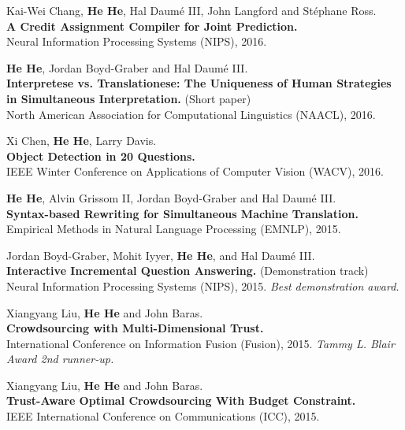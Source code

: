 \documentclass[margin,line]{resume}
\begin{document}
\begin{resume}
Kai-Wei Chang, {\bf He He}, Hal Daum\'e III, John Langford and St\'ephane Ross.\\
{\bf A Credit Assignment Compiler for Joint Prediction.}\\
Neural Information Processing Systems (NIPS), 2016. 

{\bf He He}, Jordan Boyd-Graber and Hal Daum\'e III.\\
{\bf Interpretese vs. Translationese: The Uniqueness of Human Strategies in Simultaneous Interpretation.} (Short paper)\\
North American Association for Computational Linguistics (NAACL), 2016.%

Xi Chen, {\bf He He}, Larry Davis.\\
{\bf Object Detection in 20 Questions.}\\
IEEE Winter Conference on Applications of Computer Vision (WACV), 2016.%

{\bf He He}, Alvin Grissom II, Jordan Boyd-Graber and Hal Daum\'e III.\\
{\bf Syntax-based Rewriting for Simultaneous Machine Translation.}\\
Empirical Methods in Natural Language Processing (EMNLP), 2015.%

Jordan Boyd-Graber, Mohit Iyyer, {\bf He He}, and Hal Daum\'e III.\\
{\bf Interactive Incremental Question Answering.} (Demonstration track)\\
Neural Information Processing Systems (NIPS), 2015. 
\emph{Best demonstration award.}

Xiangyang Liu, {\bf He He} and John Baras.\\
{\bf Crowdsourcing with Multi-Dimensional Trust.}\\
International Conference on Information Fusion (Fusion), 2015.
\emph{Tammy L. Blair Award 2nd runner-up.}

Xiangyang Liu, {\bf He He} and John Baras.\\
{\bf Trust-Aware Optimal Crowdsourcing With Budget Constraint.}\\
IEEE International Conference on Communications (ICC), 2015.%


\end{resume}
\end{document}

